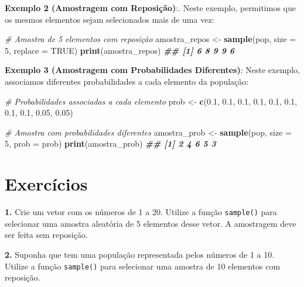 \documentclass[
]{book}
\newenvironment{Shaded}{\begin{snugshade}}{\end{snugshade}}
\newcommand{\AttributeTok}[1]{\textcolor[rgb]{0.13,0.29,0.53}{#1}}
\newcommand{\CommentTok}[1]{\textcolor[rgb]{0.56,0.35,0.01}{\textit{#1}}}
\newcommand{\ConstantTok}[1]{\textcolor[rgb]{0.56,0.35,0.01}{#1}}
\newcommand{\DecValTok}[1]{\textcolor[rgb]{0.00,0.00,0.81}{#1}}
\newcommand{\DocumentationTok}[1]{\textcolor[rgb]{0.56,0.35,0.01}{\textbf{\textit{#1}}}}
\newcommand{\FloatTok}[1]{\textcolor[rgb]{0.00,0.00,0.81}{#1}}
\newcommand{\FunctionTok}[1]{\textcolor[rgb]{0.13,0.29,0.53}{\textbf{#1}}}
\newcommand{\NormalTok}[1]{#1}
\newcommand{\OtherTok}[1]{\textcolor[rgb]{0.56,0.35,0.01}{#1}}
\begin{document}
\textbf{Exemplo 2 (Amostragem com Reposição)}:. Neste exemplo, permitimos que
os mesmos elementos sejam selecionados mais de uma vez:

\begin{Shaded}
\begin{Highlighting}[]
\CommentTok{\# Amostra de 5 elementos com reposição}
\NormalTok{amostra\_repos }\OtherTok{\textless{}{-}} \FunctionTok{sample}\NormalTok{(pop, }\AttributeTok{size =} \DecValTok{5}\NormalTok{, }\AttributeTok{replace =} \ConstantTok{TRUE}\NormalTok{)}
\FunctionTok{print}\NormalTok{(amostra\_repos)}
\DocumentationTok{\#\# [1] 6 8 9 9 6}
\end{Highlighting}
\end{Shaded}

\textbf{Exemplo 3 (Amostragem com Probabilidades Diferentes)}: Neste exemplo,
associamos diferentes probabilidades a cada elemento da população:

\begin{Shaded}
\begin{Highlighting}[]
\CommentTok{\# Probabilidades associadas a cada elemento}
\NormalTok{prob }\OtherTok{\textless{}{-}} \FunctionTok{c}\NormalTok{(}\FloatTok{0.1}\NormalTok{, }\FloatTok{0.1}\NormalTok{, }\FloatTok{0.1}\NormalTok{, }\FloatTok{0.1}\NormalTok{, }\FloatTok{0.1}\NormalTok{, }\FloatTok{0.1}\NormalTok{, }\FloatTok{0.1}\NormalTok{, }\FloatTok{0.1}\NormalTok{, }\FloatTok{0.05}\NormalTok{, }\FloatTok{0.05}\NormalTok{)}

\CommentTok{\# Amostra com probabilidades diferentes}
\NormalTok{amostra\_prob }\OtherTok{\textless{}{-}} \FunctionTok{sample}\NormalTok{(pop, }\AttributeTok{size =} \DecValTok{5}\NormalTok{, }\AttributeTok{prob =}\NormalTok{ prob)}
\FunctionTok{print}\NormalTok{(amostra\_prob)}
\DocumentationTok{\#\# [1] 2 4 6 5 3}
\end{Highlighting}
\end{Shaded}

\section{Exercícios}\label{exercuxedcios-20}

\textbf{1.} Crie um vetor com os números de 1 a 20. Utilize a função
\texttt{sample()} para selecionar uma amostra aleatória de 5 elementos desse
vetor. A amostragem deve ser feita sem reposição.

\textbf{2.} Suponha que tem uma população representada pelos números de 1 a
10. Utilize a função \texttt{sample()} para selecionar uma amostra de 10
elementos com reposição.
\end{document}

